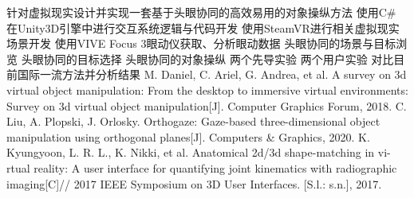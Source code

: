 \assignReq
{针对虚拟现实设计并实现一套基于头眼协同的高效易用的对象操纵方法}
{使用C\# 在Unity3D引擎中进行交互系统逻辑与代码开发}
{使用SteamVR进行相关虚拟现实场景开发}
{使用VIVE Focus 3眼动仪获取、分析眼动数据}
{}
\assignWork
{头眼协同的场景与目标浏览}
{头眼协同的目标选择}
{头眼协同的对象操纵}
{两个先导实验}
{两个用户实验}
{对比目前国际一流方法并分析结果}
\assignRef
{M. Daniel, C. Ariel, G. Andrea, et al. A survey on 3d virtual object manipulation: }
{From the desktop to immersive virtual environments: Survey on 3d virtual object }
{manipulation[J]. Computer Graphics Forum, 2018.}
{C. Liu, A. Plopski, J. Orlosky. Orthogaze: Gaze­-based three­-dimensional object }
{manipu­lation using orthogonal planes[J]. Computers \& Graphics, 2020.}
{K. Kyungyoon, L. R. L., K. Nikki, et al. Anatomical 2d/3d shape­-matching in vi-}
{rtual reality: A user interface for quantifying joint kinematics with radiographic }
{imaging[C]// 2017 IEEE Symposium on 3D User Interfaces. [S.l.: s.n.], 2017.}
